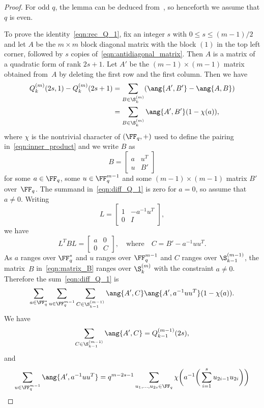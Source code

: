 \begin{proof}
For odd $q$, the lemma can be deduced from~\cite[Lemma~6.1]{Sch2015}, so henceforth we assume that $q$ is even.
\par
To prove the identity~\eqref{eqn:rec_Q_1}, fix an integer $s$ with $0\le s\le (m-1)/2$ and let $A$ be the $m\times m$ block diagonal matrix with the block $(1)$ in the top left corner, followed by $s$ copies of~\eqref{eqn:antidiagonal_matrix}. Then $A$ is a matrix of a quadratic form of rank $2s+1$. Let $A'$ be the $(m-1)\times (m-1)$ matrix obtained from~$A$ by deleting the first row and the first column. Then we have
\begin{align}
Q^{(m)}_k(2s,1)-Q^{(m)}_k(2s+1)&=\sum_{B\in\S^{(m)}_k}(\ang{A',B'}-\ang{A,B})   \nonumber\\
&=\sum_{B\in\S^{(m)}_k}\ang{A',B'}(1-\chi(a)),   \label{eqn:diff_Q_1}
\end{align}
where $\chi$ is the nontrivial character of $(\FF_q,+)$ used to define the pairing in~\eqref{eqn:inner_product} and we write $B$ as
\begin{equation}
B=\begin{bmatrix}
a & u^T\\
u & B'
\end{bmatrix}   \label{eqn:matrix_B}
\end{equation}
for some $a\in\FF_q$, some $u\in\FF_q^{m-1}$ and some $(m-1)\times (m-1)$ matrix $B'$ over~$\FF_q$. The summand in~\eqref{eqn:diff_Q_1} is zero for $a=0$, so assume that $a\ne 0$. Writing
\[
L=\begin{bmatrix}
1 & -a^{-1}u^T\\
0 & I
\end{bmatrix},
\]
we have
\[
L^TBL=\begin{bmatrix}
a & 0\\
0 & C
\end{bmatrix},
\quad\text{where}\quad
C=B'-a^{-1}uu^T.
\]
As $a$ ranges over $\FF_q^*$ and $u$ ranges over $\FF_q^{m-1}$ and $C$ ranges over $\S^{(m-1)}_{k-1}$, the matrix~$B$ in~\eqref{eqn:matrix_B} ranges over $\S^{(m)}_k$ with the constraint $a\ne 0$. Therefore the sum~\eqref{eqn:diff_Q_1} is
\[
\sum_{a\in\FF_q^*}\sum_{u\in\FF_q^{m-1}}\sum_{C\in\S^{(m-1)}_{k-1}}\ang{A',C}\ang{A',a^{-1}uu^T}(1-\chi(a)).
\]
We have
\[
\sum_{C\in\S^{(m-1)}_{k-1}}\ang{A',C}=Q^{(m-1)}_{k-1}(2s),
\]
and
\begin{align*}
\sum_{u\in\FF_q^{m-1}}\ang{A',a^{-1}uu^T}&=q^{m-2s-1}\sum_{u_1,\dots,u_{2s}\in\FF_q}\chi\bigg(a^{-1}\bigg(\sum_{i=1}^su_{2i-1}u_{2i}\bigg)\bigg)\\

\end{align*}
\end{proof}
